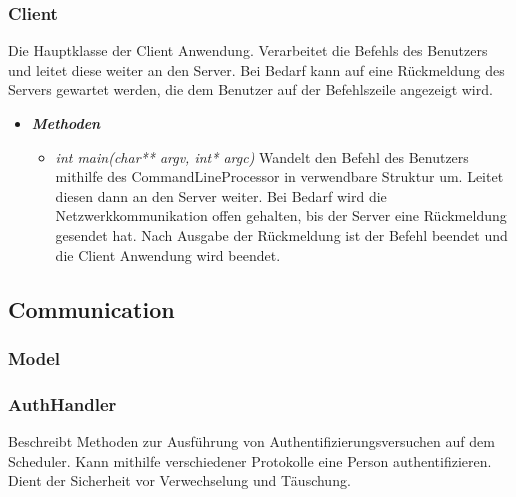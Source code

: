 \documentclass[a4paper,12pt]{article}
\begin{document}
\subsubsection{Client}

Die Hauptklasse der Client Anwendung. Verarbeitet die Befehls des Benutzers und leitet diese weiter an den Server. Bei Bedarf kann auf eine Rückmeldung des Servers gewartet werden, die dem Benutzer auf der Befehlszeile angezeigt wird.

\begin{itemize}[label={}]

	\item \textit{\textbf{Methoden}}
		\begin{itemize}[label={\textbullet}]

			\item \textit{int main(char** argv, int* argc)} Wandelt den Befehl des Benutzers mithilfe des CommandLineProcessor in verwendbare Struktur um. Leitet diesen dann an den Server weiter. Bei Bedarf wird die Netzwerkkommunikation offen gehalten, bis der Server eine Rückmeldung gesendet hat. Nach Ausgabe der Rückmeldung ist der Befehl beendet und die Client Anwendung wird beendet.
			
		\end{itemize}

\end{itemize}

\clearpage


\subsection{Communication}

\subsubsection{Model}



\subsubsection{AuthHandler}

Beschreibt Methoden zur Ausführung von Authentifizierungsversuchen auf dem Scheduler. Kann mithilfe verschiedener Protokolle eine Person authentifizieren. Dient der Sicherheit vor Verwechselung und Täuschung.
\end{document}
